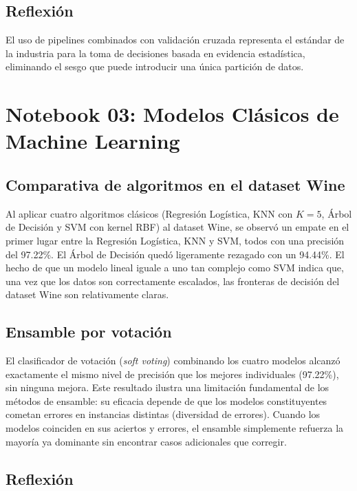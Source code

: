 \documentclass[12pt, a4paper]{article}
\begin{document}
\subsection{Reflexión}

El uso de pipelines combinados con validación cruzada representa el estándar de la industria para la toma de decisiones basada en evidencia estadística, eliminando el sesgo que puede introducir una única partición de datos.

\section{Notebook 03: Modelos Clásicos de Machine Learning}

\subsection{Comparativa de algoritmos en el dataset Wine}

Al aplicar cuatro algoritmos clásicos (Regresión Logística, KNN con $K=5$, Árbol de Decisión y SVM con kernel RBF) al dataset Wine, se observó un empate en el primer lugar entre la Regresión Logística, KNN y SVM, todos con una precisión del 97.22\%. El Árbol de Decisión quedó ligeramente rezagado con un 94.44\%. El hecho de que un modelo lineal iguale a uno tan complejo como SVM indica que, una vez que los datos son correctamente escalados, las fronteras de decisión del dataset Wine son relativamente claras.

\subsection{Ensamble por votación}

El clasificador de votación (\textit{soft voting}) combinando los cuatro modelos alcanzó exactamente el mismo nivel de precisión que los mejores individuales (97.22\%), sin ninguna mejora. Este resultado ilustra una limitación fundamental de los métodos de ensamble: su eficacia depende de que los modelos constituyentes cometan errores en instancias distintas (diversidad de errores). Cuando los modelos coinciden en sus aciertos y errores, el ensamble simplemente refuerza la mayoría ya dominante sin encontrar casos adicionales que corregir.

\subsection{Reflexión}
\end{document}
